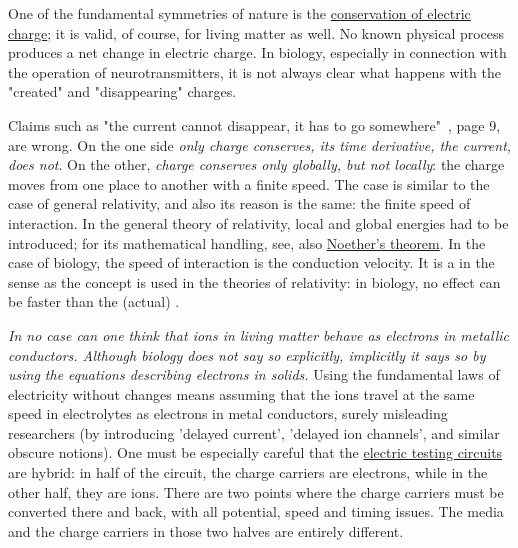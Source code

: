 {
One of the fundamental symmetries of nature is the \href{http://hyperphysics.phy-astr.gsu.edu/hbase/hframe.html}{conservation of electric charge}; it is valid, of course, for living matter as well. No known physical process produces a net change in electric charge. 
In biology, especially in connection with the operation
of neurotransmitters, it is not always clear what happens with the "created" and "disappearing" charges.

Claims such as "the current cannot disappear, it has to go somewhere"~\cite{KochBiophysics:1999}, page 9, are wrong. On the one side \textit{only charge conserves, its time derivative, the current, does not}. On the other,
\textit{charge conserves only globally, but not locally}: 
the charge moves from one place to another with a finite speed. The case is similar to the case of general relativity, and also its reason is the same: the finite speed of interaction. In the general theory of relativity, local and global energies had to be introduced; for its mathematical handling, see, also \href{https://en.wikipedia.org/wiki/Noether's_theorem}{Noether's theorem}.
In the case of biology, the 
speed of interaction is the conduction velocity. 
It is a  in the sense as the concept is used in
the theories of relativity: in biology, no effect can be faster
than the (actual) .
}


\textit{In no case can one think that ions in living matter
behave as electrons in metallic conductors. Although biology does not say so explicitly, implicitly it says so by using the equations
describing electrons in solids.} Using the fundamental laws of electricity without changes means assuming that the ions
travel at the same speed in electrolytes as electrons in metal conductors, surely misleading researchers (by introducing 'delayed current', 'delayed ion channels', and similar obscure notions).
One must be especially careful that the \hyperlink{Biologicalcircuits}{electric testing circuits} are hybrid: 
in half of the circuit, the charge carriers are electrons, while in the
other half, they are ions. There are two points where the charge carriers
must be converted there and back, with all potential, speed and timing issues.
The media and the charge carriers in those two halves are entirely different.



